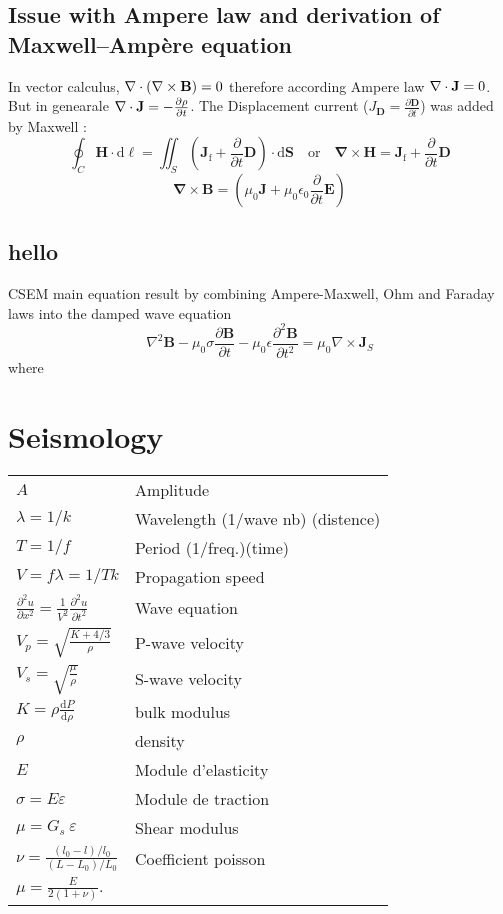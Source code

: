 \documentclass[twocolumn]{article}
\begin{document}
\subsection{Issue with Ampere law and derivation of Maxwell–Ampère equation}
In vector calculus, $\nabla\cdot(\nabla\times\bold{B}) = 0 $ therefore according Ampere law $\nabla\cdot \bold{J} = 0$. But in genearale $\nabla\cdot \bold{J} = -\frac{\partial \rho}{\partial t} $. The Displacement current ($J_\mathbf{D}=\frac{\partial \mathbf{D}}{ \partial t}$) was added by Maxwell :
\[ \oint_C \mathbf{H} \cdot \mathrm{d}\boldsymbol{\ell} =  \iint_S \left( \mathbf{J}_{\mathrm{f}} + \frac{\partial }{\partial t}\mathbf{D} \right) \cdot \mathrm{d} \mathbf{S}    \quad \text{or} \quad \mathbf{\nabla} \times \mathbf{H} = \mathbf{J}_{\mathrm{f}}+\frac{\partial }{\partial t}\mathbf{D} \]
\[\mathbf{\nabla}\times \mathbf{B} = \left(\mu_0\mathbf{J}+\mu_0 \epsilon_0 \frac{\partial }{\partial t}\mathbf{E}\right) \]

\subsection{hello}
CSEM main equation result by combining Ampere-Maxwell, Ohm and Faraday laws into the damped wave equation
\[ \nabla ^2 \mathbf{B}  - \mu_0 \sigma \frac{\partial \mathbf{B}}{\partial t} - \mu_0 \epsilon \frac{\partial^2 \mathbf{B}}{\partial t^2}  = \mu_0 \nabla \times \mathbf{J}_S\] 
where







\section{Seismology}
\begin{tabular}{@{}ll@{}}
$A$ & Amplitude\\
$\lambda = 1/k$ & Wavelength (1/wave nb) (distence)\\
$T=1/f$ & Period (1/freq.)(time)\\
$V=f\lambda=1/Tk$&Propagation speed \\
$\frac{ \partial^2 u }{ \partial x^2 } = \frac{1}{V^2} \frac{ \partial^2 u }{ \partial  t^2 }$ & Wave equation\\
$V_p=\sqrt{\frac{K+4/3}{\rho}}$&P-wave velocity\\
$V_s=\sqrt{\frac{\mu}{\rho}}$&S-wave velocity\\
$K=\rho \frac{\mathrm d P}{\mathrm d \rho}$ & bulk modulus\\
$\rho$& density\\
$E$ & Module d'elasticity\\
$ \sigma = E \varepsilon$  & Module de traction \\
$\mu = G_s \ \varepsilon$ & Shear modulus\\
$ \nu = \frac{(l_0-l)/l_0}{(L-L_0)/L_0}$ & Coefficient poisson\\
$\mu = \frac {E}{2(1+\nu)}.$ &\\

\end{tabular}
\end{document}

